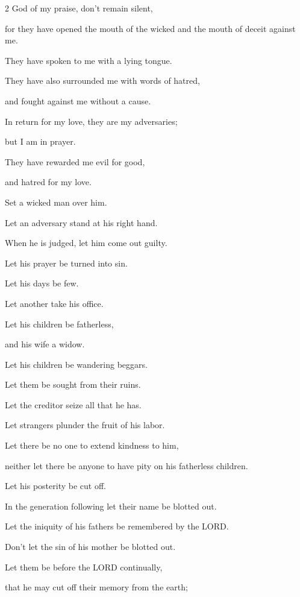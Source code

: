 \begin{multicols}{2}
	\myverse*{}God of my praise, don’t remain silent,
	
	
	\myverse{}for they have opened the mouth of the wicked and the
	mouth of deceit against me.
	
	They have spoken to me with a lying tongue.
	
	
	\myverse{}They have also surrounded me with words of hatred,
	
	and fought against me without a cause.
	
	
	\myverse{}In return for my love, they are my adversaries;
	
	but I am in prayer.
	
	
	\myverse{}They have rewarded me evil for good,
	
	and hatred for my love.
	
	
	\myverse{}Set a wicked man over him.
	
	Let an adversary stand at his right hand.
	
	
	\myverse{}When he is judged, let him come out guilty.
	
	Let his prayer be turned into sin.
	
	
	\myverse{}Let his days be few.
	
	Let another take his office.
	
	
	\myverse{}Let his children be fatherless,
	
	and his wife a widow.
	
	
	\myverse{}Let his children be wandering beggars.
	
	Let them be sought from their ruins.
	
	
	\myverse{}Let the creditor seize all that he has.
	
	Let strangers plunder the fruit of his labor.
	
	
	\myverse{}Let there be no one to extend kindness to him,
	
	neither let there be anyone to have pity on his fatherless children.
	
	
	\myverse{}Let his posterity be cut off.
	
	In the generation following let their name be blotted out.
	
	
	\myverse{}Let the iniquity of his fathers be remembered by the LORD.
	
	Don’t let the sin of his mother be blotted out.
	
	
	\myverse{}Let them be before the LORD continually,
	
	that he may cut off their memory from the earth;
	

\end{multicols}
